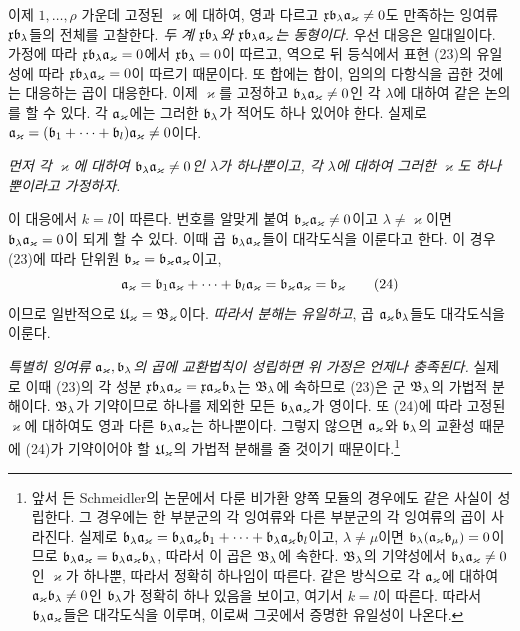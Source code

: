 이제 \(1,\ldots,\rho\) 가운데 고정된 \(\varkappa\)에 대하여, 영과 다르고 \(\mathfrak x\mathfrak{b}_\lambda\mathfrak{a}_\varkappa\ne0\)도 만족하는 잉여류 \(\mathfrak x\mathfrak{b}_\lambda\)들의 전체를 고찰한다. \emph{두 계 \(\mathfrak x\mathfrak{b}_\lambda\)와 \(\mathfrak x\mathfrak{b}_\lambda\mathfrak{a}_\varkappa\)는 동형이다.} 우선 대응은 일대일이다. 가정에 따라 \(\mathfrak x\mathfrak{b}_\lambda\mathfrak{a}_\varkappa=0\)에서 \(\mathfrak x\mathfrak{b}_\lambda=0\)이 따르고, 역으로 뒤 등식에서 표현 (23)의 유일성에 따라 \(\mathfrak x\mathfrak{b}_\lambda\mathfrak{a}_\varkappa=0\)이 따르기 때문이다. 또 합에는 합이, 임의의 다항식을 곱한 것에는 대응하는 곱이 대응한다. 이제 \(\varkappa\)를 고정하고 \(\mathfrak{b}_\lambda\mathfrak{a}_\varkappa\ne0\)인 각 \(\lambda\)에 대하여 같은 논의를 할 수 있다. 각 \(\mathfrak{a}_\varkappa\)에는 그러한 \(\mathfrak{b}_\lambda\)가 적어도 하나 있어야 한다. 실제로 \(\mathfrak{a}_\varkappa=(\mathfrak{b}_1+\cdots+\mathfrak{b}_l)\mathfrak{a}_\varkappa\ne0\)이다.

\emph{먼저 각 \(\varkappa\)에 대하여 \(\mathfrak{b}_\lambda\mathfrak{a}_\varkappa\ne0\)인 \(\lambda\)가 하나뿐이고, 각 \(\lambda\)에 대하여 그러한 \(\varkappa\)도 하나뿐이라고 가정하자.}

이 대응에서 \(k=l\)이 따른다. 번호를 알맞게 붙여 \(\mathfrak{b}_\varkappa\mathfrak{a}_\varkappa\ne0\)이고 \(\lambda\ne\varkappa\)이면 \(\mathfrak{b}_\lambda\mathfrak{a}_\varkappa=0\)이 되게 할 수 있다. 이때 곱 \(\mathfrak{b}_\lambda\mathfrak{a}_\varkappa\)들이 대각도식을 이룬다고 한다. 이 경우 (23)에 따라 단위원 \(\mathfrak{b}_\varkappa=\mathfrak{b}_\varkappa\mathfrak{a}_\varkappa\)이고,
\begin{equation}
 \mathfrak{a}_\varkappa
 =\mathfrak{b}_1\mathfrak{a}_\varkappa+\cdots+\mathfrak{b}_l\mathfrak{a}_\varkappa
 =\mathfrak{b}_\varkappa\mathfrak{a}_\varkappa
 =\mathfrak{b}_\varkappa
\tag{24}
\end{equation}
이므로 일반적으로 \(\mathfrak U_\varkappa=\mathfrak B_\varkappa\)이다. \emph{따라서 분해는 유일하고}, 곱 \(\mathfrak{a}_\varkappa\mathfrak{b}_\lambda\)들도 대각도식을 이룬다.

\emph{특별히 잉여류 \(\mathfrak{a}_\varkappa,\mathfrak{b}_\lambda\)의 곱에 교환법칙이 성립하면 위 가정은 언제나 충족된다.} 실제로 이때 (23)의 각 성분 \(\mathfrak x\mathfrak{b}_\lambda\mathfrak{a}_\varkappa=\mathfrak x\mathfrak{a}_\varkappa\mathfrak{b}_\lambda\)는 \(\mathfrak B_\lambda\)에 속하므로 (23)은 군 \(\mathfrak B_\lambda\)의 가법적 분해이다. \(\mathfrak B_\lambda\)가 기약이므로 하나를 제외한 모든 \(\mathfrak{b}_\lambda\mathfrak{a}_\varkappa\)가 영이다. 또 (24)에 따라 고정된 \(\varkappa\)에 대하여도 영과 다른 \(\mathfrak{b}_\lambda\mathfrak{a}_\varkappa\)는 하나뿐이다. 그렇지 않으면 \(\mathfrak{a}_\varkappa\)와 \(\mathfrak{b}_\lambda\)의 교환성 때문에 (24)가 기약이어야 할 \(\mathfrak U_\varkappa\)의 가법적 분해를 줄 것이기 때문이다.\footnote{앞서 든 Schmeidler의 논문에서 다룬 비가환 양쪽 모듈의 경우에도 같은 사실이 성립한다. 그 경우에는 한 부분군의 각 잉여류와 다른 부분군의 각 잉여류의 곱이 사라진다. 실제로 \(\mathfrak{b}_\lambda\mathfrak{a}_\varkappa=\mathfrak{b}_\lambda\mathfrak{a}_\varkappa\mathfrak{b}_1+\cdots+\mathfrak{b}_\lambda\mathfrak{a}_\varkappa\mathfrak{b}_l\)이고, \(\lambda\ne\mu\)이면 \(\mathfrak{b}_\lambda(\mathfrak{a}_\varkappa\mathfrak{b}_\mu)=0\)이므로 \(\mathfrak{b}_\lambda\mathfrak{a}_\varkappa=\mathfrak{b}_\lambda\mathfrak{a}_\varkappa\mathfrak{b}_\lambda\), 따라서 이 곱은 \(\mathfrak B_\lambda\)에 속한다. \(\mathfrak B_\lambda\)의 기약성에서 \(\mathfrak{b}_\lambda\mathfrak{a}_\varkappa\ne0\)인 \(\varkappa\)가 하나뿐, 따라서 정확히 하나임이 따른다. 같은 방식으로 각 \(\mathfrak{a}_\varkappa\)에 대하여 \(\mathfrak{a}_\varkappa\mathfrak{b}_\lambda\ne0\)인 \(\mathfrak{b}_\lambda\)가 정확히 하나 있음을 보이고, 여기서 \(k=l\)이 따른다. 따라서 \(\mathfrak{b}_\lambda\mathfrak{a}_\varkappa\)들은 대각도식을 이루며, 이로써 그곳에서 증명한 유일성이 나온다.}

